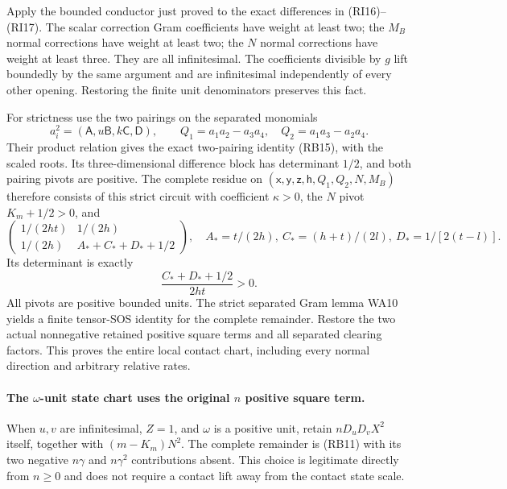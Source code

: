 Apply the bounded conductor just proved to the exact differences in
(RI16)--(RI17). The scalar correction Gram coefficients have weight
at least two; the $M_B$ normal corrections have weight at least two;
the $N$ normal corrections have weight at least three. They are all
infinitesimal. The coefficients divisible by $g$ lift boundedly by the
same argument and are infinitesimal independently of every other
opening. Restoring the finite unit denominators preserves this fact.

For strictness use the two pairings on the separated monomials
\[
 a_i^2=(\mathsf A,u\mathsf B,k\mathsf C,\mathsf D),\qquad
 Q_1=a_1a_2-a_3a_4,\quad Q_2=a_1a_3-a_2a_4.
\]
Their product relation gives the exact two-pairing identity (RB15),
with the scaled roots. Its three-dimensional difference block has
determinant $1/2$, and both pairing pivots are positive. The complete
residue on
$(\mathsf x,\mathsf y,\mathsf z,\mathsf h,Q_1,Q_2,N,M_B)$
therefore consists of this strict circuit with coefficient
$\kappa>0$, the $N$ pivot $K_m+1/2>0$, and
\[
 \begin{pmatrix}
 1/(2ht)&1/(2h)\\
 1/(2h)&A_*+C_*+D_*+1/2
 \end{pmatrix},
 \quad A_*=t/(2h),\ C_*=(h+t)/(2l),\ D_*=1/[2(t-l)].
 \tag{RI19}
\]
Its determinant is exactly
\[
 \frac{C_*+D_*+1/2}{2ht}>0.                         \tag{RI20}
\]
All pivots are positive bounded units. The strict separated Gram
lemma WA10 yields a finite tensor-SOS identity for the complete
remainder. Restore the two actual nonnegative retained positive square terms and
all separated clearing factors. This proves the entire local contact
chart, including every normal direction and arbitrary relative rates.

\paragraph{The $\omega$-unit state chart uses the original $n$ positive square term.}
When $u,v$ are infinitesimal, $Z=1$, and $\omega$ is a positive unit,
retain $nD_uD_vX^2$ itself, together with $(m-K_m)N^2$.
The complete remainder is (RB11) with its two negative $n\gamma$
and $n\gamma^2$ contributions absent. This choice is legitimate
directly from $n\geq0$ and does not require a contact lift away from
the contact state scale.

